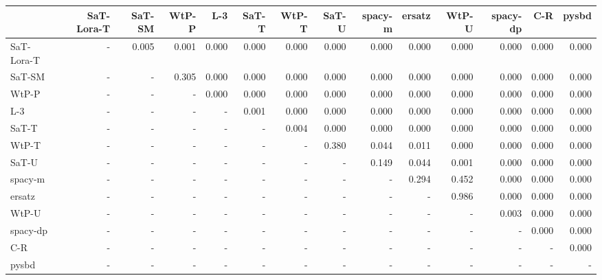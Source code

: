 \begin{tabular}{lrrrrrrrrrrrrr}
\toprule
 & SaT-Lora-T & SaT-SM & WtP-P & L-3 & SaT-T & WtP-T & SaT-U & spacy-m & ersatz & WtP-U & spacy-dp & C-R & pysbd \\
\midrule
SaT-Lora-T & - & 0.005 & 0.001 & 0.000 & 0.000 & 0.000 & 0.000 & 0.000 & 0.000 & 0.000 & 0.000 & 0.000 & 0.000 \\
SaT-SM & - & - & 0.305 & 0.000 & 0.000 & 0.000 & 0.000 & 0.000 & 0.000 & 0.000 & 0.000 & 0.000 & 0.000 \\
WtP-P & - & - & - & 0.000 & 0.000 & 0.000 & 0.000 & 0.000 & 0.000 & 0.000 & 0.000 & 0.000 & 0.000 \\
L-3 & - & - & - & - & 0.001 & 0.000 & 0.000 & 0.000 & 0.000 & 0.000 & 0.000 & 0.000 & 0.000 \\
SaT-T & - & - & - & - & - & 0.004 & 0.000 & 0.000 & 0.000 & 0.000 & 0.000 & 0.000 & 0.000 \\
WtP-T & - & - & - & - & - & - & 0.380 & 0.044 & 0.011 & 0.000 & 0.000 & 0.000 & 0.000 \\
SaT-U & - & - & - & - & - & - & - & 0.149 & 0.044 & 0.001 & 0.000 & 0.000 & 0.000 \\
spacy-m & - & - & - & - & - & - & - & - & 0.294 & 0.452 & 0.000 & 0.000 & 0.000 \\
ersatz & - & - & - & - & - & - & - & - & - & 0.986 & 0.000 & 0.000 & 0.000 \\
WtP-U & - & - & - & - & - & - & - & - & - & - & 0.003 & 0.000 & 0.000 \\
spacy-dp & - & - & - & - & - & - & - & - & - & - & - & 0.000 & 0.000 \\
C-R & - & - & - & - & - & - & - & - & - & - & - & - & 0.000 \\
pysbd & - & - & - & - & - & - & - & - & - & - & - & - & - \\
\bottomrule
\end{tabular}

